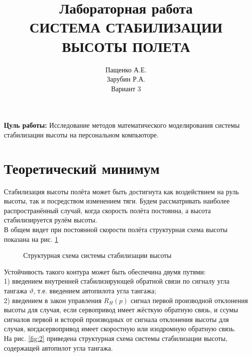 \documentclass[a4paper,12pt]{article}
\title{\textbf{Лабораторная работа}\\ СИСТЕМА СТАБИЛИЗАЦИИ ВЫСОТЫ ПОЛЕТА}
\author{Пащенко А.Е.\\Зарубин Р.А.\\Вариант 3}
\date{}
\begin{document}
 

\maketitle %
\textbf{Цуль работы:} Исследование методов математического моделирования системы стабилизации высоты на персональном компьюторе.
\section{Теоретический минимум}
Стабилизация высоты полёта может быть достигнута как воздействием на руль высоты, так и посредством изменением тяги. Будем рассматривать наиболее распространённый случай, 
когда скорость полёта постоянна, а высота стабилизируется рулём высоты.\\
В общем видет при постоянной скорости полёта структурная схема высоты показана 
на рис. \ref{fig:1}

\begin{figure}[H]
    \caption{Структурная схема системы стабилизации высоты}
    \label{fig:1}
\end{figure}
 
Устойчивость такого контура может быть обеспечина двумя путями: \\ 

1) введением внутренней стабилизирующей обратной связи по сигналу угла тангажа 
$\vartheta$, т.е. введением автопилота угла тангажа;\\

2) введением в закон управления $R_{H}(p)$ сигнал первой производной отклонения высоты для случая, если сервопривод имеет жёсткую обратную связь,
и ссумы сигналов первой и всторой производных от сигнала отклонения высоты для случая, 
когдасервопривод имеет скоростную или изодромную обратную связь.\\

На рис. \ref{fig:2} приведена структурная схема системы стабилизации высоты, содержащей автопилот угла тангажа.
\end{document}
